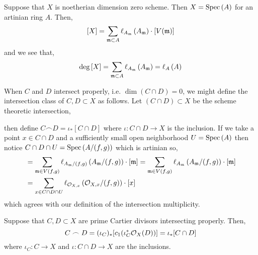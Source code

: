 \documentclass[12pt]{article}
\begin{document}
\begin{example}
Suppose that $X$ is noetherian dimension zero scheme. Then $X = \mathrm{Spec}\left( A \right)$ for an artinian ring $A$. Then,
\[ [X] = \sum_{\mathfrak{m} \subset A}  \ell_{A_{\mathfrak{m}}} \left( A_{\mathfrak{m}} \right) \cdot [V(\mathfrak{m})] \]
and we see that,
\[ \deg{[X]} = \sum_{\mathfrak{m} \subset A} \ell_{A_{\mathfrak{m}}} \left( A_{\mathfrak{m}} \right) = \ell_{A} \left( A \right) \]
\end{example}


\begin{rmk}
When $C$ and $D$ intersect properly, i.e. $\dim{(C \cap D)} = 0$, we might define the intersection class of $C, D \subset X$ as follows. Let $(C \cap D) \subset X$ be the scheme theoretic intersection,
\begin{center}
\end{center}
then define $C \frown D = \iota_* [C \cap D]$ where $\iota : C \cap D \to X$ is the inclusion. If we take a point $x \in C \cap D$ and a sufficiently small open neighborhood $U = \mathrm{Spec}\left( A \right)$ then notice $C \cap D \cap U = \mathrm{Spec}\left( A / (f, g) \right)$ which is artinian so,
\begin{align*}
[C \cap D \cap U] & = \sum_{\m \in V(f, g)} \ell_{A_\m / (f, g)} \left( A_\m / (f, g) \right) \cdot [\m] = \sum_{\m \in V(f, g)} \ell_{A_\m} \left( A_\m /(f, g) \right) \cdot [\m] 
\\
& = \sum_{x \in C \cap D \cap U} \ell_{\stalk{X}{x}} \left( \stalk{X}{x} / (f, g) \right) \cdot [x] 
\end{align*}
which agrees with our definition of the intersection multiplicity.
\end{rmk}

\begin{prop}
Suppose that $C, D \subset X$ are prime Cartier divisors intersecting properly. Then,
\[ C \frown D = (\iota_C)_* [c_1( \iota^*_C \mathcal{O}_{X}(D))] = \iota_* [C \cap D] \]
where $\iota_C : C \to X$ and $\iota : C \cap D \to X$ are the inclusions.
\end{prop}
\end{document}
